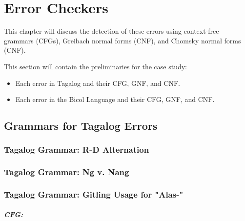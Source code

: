 \chapter{Error Checkers}
This chapter will discuss the detection of these errors using context-free grammars (CFGs), Greibach normal forms (CNF), and Chomsky normal forms (CNF).

{\color{blue}
This section will contain the preliminaries for the case study:

\begin{itemize}
    \item Each error in Tagalog and their CFG, GNF, and CNF.
    \item Each error in the Bicol Language and their CFG, GNF, and CNF.
\end{itemize}
}

\section{Grammars for Tagalog Errors}
\subsection{Tagalog Grammar: R-D Alternation}
\subsection{Tagalog Grammar: Ng v. Nang}
\subsection{Tagalog Grammar: Gitling Usage for "Alas-"}
\paragraph{CFG:}

